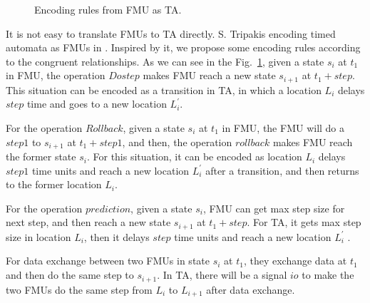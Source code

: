 \begin{figure}[htbp]
	\caption{Encoding rules from FMU as TA.}
	\label{fmutota}
\end{figure}

It is not easy to translate FMUs to TA directly. S. Tripakis encoding timed automata as FMUs in \cite{Tripakis15}. Inspired by it, we propose some encoding rules according to the congruent relationships. As we can see in the Fig.~\ref{fmutota}, given a state $s_{i}$ at $t_{1}$ in FMU, the operation $Dostep$ makes FMU reach a new state $s_{i+1}$ at $t_{1}+step$. This situation can be encoded as a transition in TA, in which a location $L_{i}$ delays $step$ time and goes to a new location $L_{i}^{\prime}$.

For the operation $Rollback$, given a state $s_{i}$ at $t_{1}$ in FMU, the FMU will do a $step1$ to $s_{i+1}$ at $t_{1}+step1$, and then, the operation $rollback$ makes FMU reach the former state $s_{i}$. For this situation, it can be encoded as location $L_{i}$ delays $step1$ time units and reach a new location $L_{i}^{\prime}$ after a transition, and then returns to the former location $L_{i}$. 

For the operation $prediction$, given a state $s_{i}$, FMU can get max step size for next step, and then reach a new state $s_{i+1}$ at $t_{1}+step$. For TA, it gets max step size in location $L_{i}$, then it delays $step$ time units and reach a new location $L_{i}^{\prime}$ .

For data exchange between two FMUs in state $s_{i}$ at $t_{1}$, they exchange data at $t_{1}$ and then do the same step to $s_{i+1}$. In TA, there will be a signal $io$ to make the two FMUs do the same step from $L_{i}$ to $L_{i+1}$ after data exchange.

